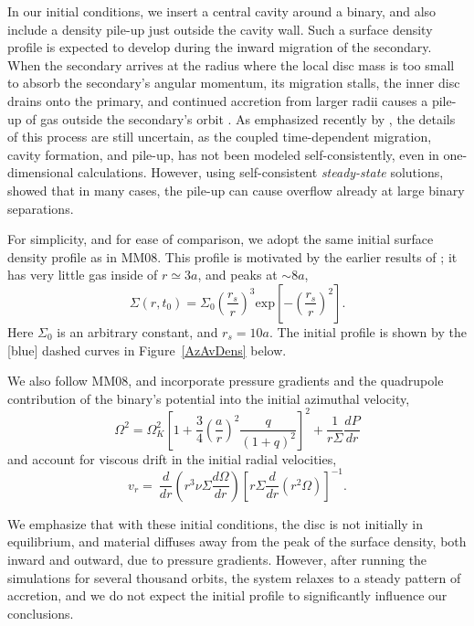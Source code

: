 In our initial conditions, we insert a central cavity around a binary,
and also include a density pile-up just outside the cavity wall.  Such
a surface density profile is expected to develop during the inward
migration of the secondary. When the secondary arrives at the radius
where the local disc mass is too small to absorb the secondary's
angular momentum, its migration stalls, the inner disc drains onto the
primary, and continued accretion from larger radii causes a pile-up of
gas outside the secondary's orbit
\citep{SyerClarke95,Ivanov99,Milos:Phinney:2005,Chang+2010,Rafikov:2013}.
As emphasized recently by \citet{Kocsis+2012a}, the details of this
process are still uncertain, as the coupled time-dependent migration,
cavity formation, and pile-up, has not been modeled self-consistently,
even in one-dimensional calculations.  However, using self-consistent
{\em steady-state} solutions, \citet{Kocsis+2012b} showed that in many
cases, the pile-up can cause overflow already at large binary
separations.

For simplicity, and for ease of comparison, we adopt the same initial
surface density profile as in MM08. This profile is motivated by the
earlier results of \cite{Milos:Phinney:2005}; it has very little gas
inside of $r\simeq3a$, and peaks at $\sim 8a$,
%
\begin{equation}
\Sigma(r, t_0) = \Sigma_0 \left( \frac{r_s}{r} \right)^{3} \mbox{exp}\left[-\left(\frac{r_s}{r}\right)^2\right].
\label{Sig0}
\end{equation}
%
Here $\Sigma_0$ is an arbitrary constant, and $r_s=10a$. The initial
profile is shown by the [blue] dashed curves in Figure~\ref{AzAvDens}
below.

We also follow MM08, and incorporate pressure gradients and the
quadrupole contribution of the binary's potential into the initial
azimuthal velocity,
%
\begin{equation}
\Omega^2 = \Omega^2_K \left[ 1 + \frac{3}{4} \left(\frac{a}{r}\right)^2  \frac{q}{(1+q)^2}\right]^2 + \frac{1}{ r \Sigma } \frac{d P}{d r}
\end{equation}
%
and account for viscous drift in the initial radial velocities,
%
\begin{equation}
v_r =  \  \frac{d }{d r} \left( r^3 \nu \Sigma \frac{d \Omega}{dr} \right)  \left[r \Sigma \frac{d}{d r} \left( r^2 \Omega\right) \right]^{-1}.
\end{equation}

We emphasize that with these initial conditions, the disc is not initially in
equilibrium, and material diffuses away from the peak of the surface
density, both inward and outward, due to pressure gradients.  However,
after running the simulations for several thousand orbits, the system
relaxes to a steady pattern of accretion, and we do not expect the
initial profile to significantly influence our conclusions.


